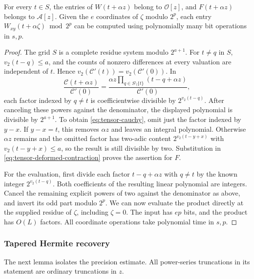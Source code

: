 \begin{lemma}\label{lem:tensor-integrality}
For every $t\in S$, the entries of $W(t+\alpha z)$ belong to
$\mathcal O[z]$, and $F(t+\alpha z)$ belongs to $\mathcal A[z]$.
Given the $e$ coordinates of $\zeta$ modulo $2^p$, each entry
$W_{xy}(t+\alpha\zeta)\bmod 2^p$ can be computed using polynomially
many bit operations in $s,p$.
\end{lemma}
\begin{proof}
The grid $S$ is a complete residue system modulo $2^{a+1}$.
For $t\ne q$ in $S$, $v_2(t-q)\le a$, and the counts of nonzero
differences at every valuation are independent of $t$.  Hence
$v_2(\mathcal C'(t))=v_2(\mathcal C'(0))$.
In
\[
 \frac{\mathcal C(t+\alpha z)}{\mathcal C'(0)}
  =\frac{\alpha z\prod_{q\in S\setminus\{t\}}
                         (t-q+\alpha z)}{\mathcal C'(0)},
\]
each factor indexed by $q\ne t$ is coefficientwise divisible by
$2^{v_2(t-q)}$.  After canceling these powers against the
denominator, the displayed polynomial is divisible by $2^{a+1}$.
To obtain \eqref{eq:tensor-cauchy}, omit just the factor indexed by
$y-x$. If $y-x=t$, this removes $\alpha z$ and leaves an integral
polynomial. Otherwise $\alpha z$ remains and the omitted factor has
two-adic content $2^{v_2(t-y+x)}$ with $v_2(t-y+x)\le a$, so the
result is still divisible by two. Substitution in
\eqref{eq:tensor-deformed-contraction} proves the assertion for $F$.

For the evaluation, first divide each factor
$t-q+\alpha z$ with $q\ne t$ by the known integer $2^{v_2(t-q)}$.
Both coefficients of the resulting linear polynomial are integers.
Cancel the remaining explicit powers of two against the denominator
as above, and invert its odd part modulo $2^p$. We can now evaluate
the product directly at the supplied residue of $\zeta$, including
$\zeta=0$. The input has $ep$ bits, and the product has $O(L)$
factors. All coordinate operations take polynomial time in $s,p$.
\end{proof}

\subsubsection{Tapered Hermite recovery}
\label{subsec:tensor-hermite}

The next lemma isolates the precision estimate.  All power-series
truncations in its statement are ordinary truncations in $z$.

